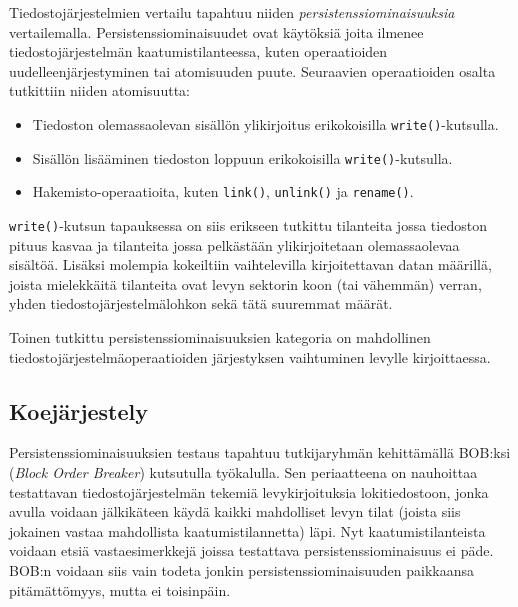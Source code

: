 Tiedostojärjestelmien vertailu tapahtuu niiden \emph{persistenssiominaisuuksia} vertailemalla.
Persistenssiominaisuudet ovat käytöksiä joita ilmenee tiedostojärjestelmän kaatumistilanteessa,
kuten operaatioiden uudelleenjärjestyminen tai atomisuuden puute.
Seuraavien operaatioiden osalta tutkittiin niiden atomisuutta:
%
\begin{itemize}
    \item{Tiedoston olemassaolevan sisällön ylikirjoitus erikokoisilla \texttt{write()}-kutsulla.}
    \item{Sisällön lisääminen tiedoston loppuun erikokoisilla \texttt{write()}-kutsulla.}
    \item{Hakemisto-operaatioita, kuten \texttt{link()}, \texttt{unlink()} ja \texttt{rename()}.}
\end{itemize}
%
\texttt{write()}-kutsun tapauksessa on siis erikseen tutkittu tilanteita jossa tiedoston pituus kasvaa ja tilanteita jossa pelkästään ylikirjoitetaan olemassaolevaa sisältöä.
Lisäksi molempia kokeiltiin vaihtelevilla kirjoitettavan datan määrillä,
joista mielekkäitä tilanteita ovat levyn sektorin koon (tai vähemmän) verran, yhden tiedostojärjestelmälohkon sekä tätä suuremmat määrät.

Toinen tutkittu persistenssiominaisuuksien kategoria on mahdollinen tiedostojärjestelmäoperaatioiden järjestyksen vaihtuminen levylle kirjoittaessa.

\subsection{Koejärjestely}
Persistenssiominaisuuksien testaus tapahtuu tutkijaryhmän kehittämällä BOB:ksi (\emph{Block Order Breaker}) kutsutulla työkalulla.
Sen periaatteena on nauhoittaa testattavan tiedostojärjestelmän tekemiä levykirjoituksia lokitiedostoon,
jonka avulla voidaan jälkikäteen käydä kaikki mahdolliset levyn tilat (joista siis jokainen vastaa mahdollista kaatumistilannetta) läpi.
Nyt kaatumistilanteista voidaan etsiä vastaesimerkkejä joissa testattava persistenssiominaisuus ei päde.
BOB:n voidaan siis vain todeta jonkin persistenssiominaisuuden paikkaansa pitämättömyys, mutta ei toisinpäin.

\newcommand{\hdr}[1]{\rotatebox[origin=l]{90}{\small \texttt{#1}}}
\pgfmathsetlengthmacro\sideA{0.8mm}
\pgfmathsetlengthmacro{}
\pgfmathsetlengthmacro{}
\def\side{1}
\newcommand{\atN}{\tikz{\draw       (0,0) rectangle (\sideA, \sideA); \draw       (\sideA,0) rectangle (\sideB, \sideB); \draw (\sideB,0) rectangle (\sideC, \sideC); }}
\newcommand{\atS}{\tikz{\draw[fill] (0,0) rectangle (\sideA, \sideA); \draw[fill] (\sideA,0) rectangle (\sideB, \sideB); \draw (\sideB,0) rectangle (\sideC, \sideC); }}
\newcommand{\atB}{\tikz{\draw[fill] (0,0) rectangle (\sideA, \sideA); \draw[fill] (\sideA,0) rectangle (\sideB, \sideB); \draw (\sideB,0) rectangle (\sideC, \sideC); }}

